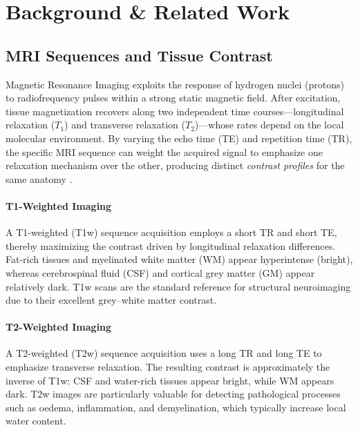 \documentclass[11pt,a4paper]{article}
\begin{document}

\section{Background \& Related Work}
\label{sec: 2}

\subsection{MRI Sequences and Tissue Contrast}
Magnetic Resonance Imaging exploits the response of hydrogen nuclei (protons) to radiofrequency pulses within a strong static magnetic field. After excitation, tissue magnetization recovers along two independent time courses---longitudinal relaxation ($T_1$) and transverse relaxation ($T_2$)---whose rates depend on the local molecular environment. By varying the echo time (TE) and repetition time (TR), the specific MRI sequence can weight the acquired signal to emphasize one relaxation mechanism over the other, producing distinct \textit{contrast profiles} for the same anatomy \cite{AD1999}.

\paragraph{T1-Weighted Imaging}
A T1-weighted (T1w) sequence acquisition employs a short TR and short TE, thereby maximizing the contrast driven by longitudinal relaxation differences. Fat-rich tissues and myelinated white matter (WM) appear hyperintense (bright), whereas cerebrospinal fluid (CSF) and cortical grey matter (GM) appear relatively dark. T1w scans are the standard reference for structural neuroimaging due to their excellent grey--white matter contrast.

\paragraph{T2-Weighted Imaging}
A T2-weighted (T2w) sequence acquisition uses a long TR and long TE to emphasize transverse relaxation. The resulting contrast is approximately the inverse of T1w: CSF and water-rich tissues appear bright, while WM appears dark. T2w images are particularly valuable for detecting pathological processes such as oedema, inflammation, and demyelination, which typically increase local water content.
\end{document}
